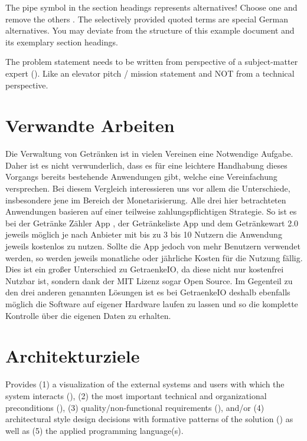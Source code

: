 \documentclass[conference,a4paper]{cs-techrep}
\begin{document}
The pipe symbol \textquote{\textbar{}} in the section headings represents alternatives! Choose one and remove the others \faWarning{}. The selectively provided quoted terms are special German alternatives. You may deviate from the structure of this example document and its exemplary section headings.

The problem statement needs to be written from perspective of a subject-matter expert (). Like an elevator pitch / mission statement \faWarning{} and NOT from a technical perspective.


\section{Verwandte Arbeiten}
Die Verwaltung von Getränken ist in vielen Vereinen eine Notwendige Aufgabe. Daher ist es nicht verwunderlich, dass es für eine leichtere Handhabung dieses Vorgangs bereits bestehende Anwendungen gibt, welche eine Vereinfachung versprechen. Bei diesem Vergleich interessieren uns vor allem die Unterschiede, insbesondere jene im Bereich der Monetarisierung.
Alle drei hier betrachteten Anwendungen basieren auf einer teilweise zahlungspflichtigen Strategie. So ist es bei der Getränke Zähler App \cite{drinkscounter}, der Getränkeliste App \cite{getraenkelisteapp} und dem Getränkewart 2.0 \cite{getraenkewart} jeweils möglich je nach Anbieter mit bis zu 3 bis 10 Nutzern die Anwendung jeweils kostenlos zu nutzen. Sollte die App jedoch von mehr Benutzern verwendet werden, so werden jeweils monatliche oder jährliche Kosten für die Nutzung fällig. Dies ist ein großer Unterschied zu GetraenkeIO, da diese nicht nur kostenfrei Nutzbar ist, sondern dank der MIT Lizenz sogar Open Source. Im Gegenteil zu den drei anderen genannten Lösungen ist es bei GetraenkeIO deshalb ebenfalls möglich die Software auf eigener Hardware laufen zu lassen und so die komplette Kontrolle über die eigenen Daten zu erhalten.

\section{Architekturziele} %
Provides
(1) a visualization of the external systems and users with which the system interacts (),
(2) the most important technical and organizational preconditions (),
(3) quality/non-functional requirements (), and/or
(4) architectural style design decisions with formative patterns of the solution ()
as well as (5) the applied programming language(s).
\end{document}
